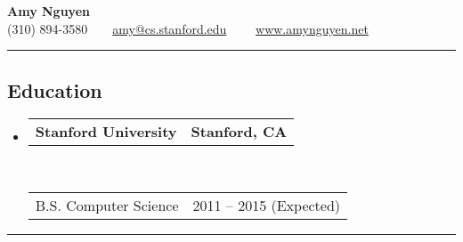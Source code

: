 \documentclass[10pt,letterpaper]{article}
\makeatletter
\newcommand{\topheaderrow}[2]
{\begin{tabular*}{\linewidth}{l@{\extracolsep{\fill}}r}
    \textbf{#1} &
    \textbf{#2}
    \vspace{0.2ex}
\end{tabular*}}
\newcommand{\botheaderrow}[2]
{\begin{tabular*}{\linewidth}{l@{\extracolsep{\fill}}r}
    #1 &
    #2 \\
\end{tabular*}}
\makeatother
\begin{document}
\begin{center}
{\LARGE \textbf{Amy Nguyen}} \\[0.09cm]
(310) 894-3580\ \ \textbullet \ \ \href{mailto:amy@cs.stanford.edu}{amy@cs.stanford.edu} \ \ \textbullet \ \ \href{http://www.amynguyen.net}{www.amynguyen.net}
\end{center}

\hrule
\vspace{-0.4em}
\subsection*{Education}
\begin{itemize}
    \item 
    \topheaderrow
        {\textbf{Stanford University}}
        {\textbf{Stanford, CA}}
    \\
    \botheaderrow
        {B.S. Computer Science}
        {2011 -- 2015 (Expected)}
\end{itemize}

\hrule
\vspace{-0.4em}
\end{document}
